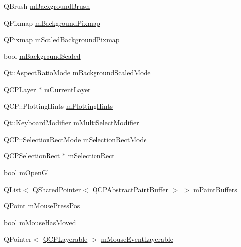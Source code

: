 \begin{DoxyCompactItemize}
\item 
Q\+Brush \mbox{\hyperlink{class_q_custom_plot_a3aef5de4ac012178e3293248e9c63737}{m\+Background\+Brush}}
\item 
Q\+Pixmap \mbox{\hyperlink{class_q_custom_plot_ae8f4677399324a78c5f8dbfb95a34f90}{m\+Background\+Pixmap}}
\item 
Q\+Pixmap \mbox{\hyperlink{class_q_custom_plot_a081bf046501d52642dc6d7e3bdb97d57}{m\+Scaled\+Background\+Pixmap}}
\item 
bool \mbox{\hyperlink{class_q_custom_plot_a62fe584b20680b1b2e1c7efb5c5416a5}{m\+Background\+Scaled}}
\item 
Qt\+::\+Aspect\+Ratio\+Mode \mbox{\hyperlink{class_q_custom_plot_ab82e8a5e3ad6b486f95d6da8bf49e9aa}{m\+Background\+Scaled\+Mode}}
\item 
\mbox{\hyperlink{class_q_c_p_layer}{Q\+C\+P\+Layer}} $\ast$ \mbox{\hyperlink{class_q_custom_plot_aa27569c92e74395af10151357d268628}{m\+Current\+Layer}}
\item 
Q\+C\+P\+::\+Plotting\+Hints \mbox{\hyperlink{class_q_custom_plot_aa184197a6101a9cc5807469e1d006c9e}{m\+Plotting\+Hints}}
\item 
Qt\+::\+Keyboard\+Modifier \mbox{\hyperlink{class_q_custom_plot_a0e97e701c5671e7e463d2ce0211d0f8a}{m\+Multi\+Select\+Modifier}}
\item 
\mbox{\hyperlink{namespace_q_c_p_ac9aa4d6d81ac76b094f9af9ad2d3aacf}{Q\+C\+P\+::\+Selection\+Rect\+Mode}} \mbox{\hyperlink{class_q_custom_plot_abe04c5def373cc4fede8de20542ca3f2}{m\+Selection\+Rect\+Mode}}
\item 
\mbox{\hyperlink{class_q_c_p_selection_rect}{Q\+C\+P\+Selection\+Rect}} $\ast$ \mbox{\hyperlink{class_q_custom_plot_a4827bc84ef5ce52dfbf9ff630ed1b276}{m\+Selection\+Rect}}
\item 
bool \mbox{\hyperlink{class_q_custom_plot_a0841dbea13bd120d20e3f0cc36767ff9}{m\+Open\+Gl}}
\item 
Q\+List$<$ Q\+Shared\+Pointer$<$ \mbox{\hyperlink{class_q_c_p_abstract_paint_buffer}{Q\+C\+P\+Abstract\+Paint\+Buffer}} $>$ $>$ \mbox{\hyperlink{class_q_custom_plot_a57b270b1e3990e0d1b9fb39b137d5a5d}{m\+Paint\+Buffers}}
\item 
Q\+Point \mbox{\hyperlink{class_q_custom_plot_ac57090da95056ae4dd67be67adfa85bd}{m\+Mouse\+Press\+Pos}}
\item 
bool \mbox{\hyperlink{class_q_custom_plot_ad2108936f001a8be5974b0b6ff13dae3}{m\+Mouse\+Has\+Moved}}
\item 
Q\+Pointer$<$ \mbox{\hyperlink{class_q_c_p_layerable}{Q\+C\+P\+Layerable}} $>$ \mbox{\hyperlink{class_q_custom_plot_a243867f445d2f4e35e00add2f589e1da}{m\+Mouse\+Event\+Layerable}}

\end{DoxyCompactItemize}
